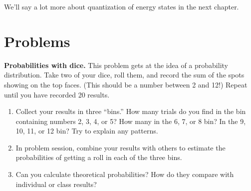 We'll say a lot more about quantization of energy states in the next chapter.

\newpage

\section*{Problems}
\label{sec:uncertainty_problems}



\begin{problem} 
 {\bf Probabilities with dice.} This problem gets at the idea of a
 probability distribution. Take two of your dice, roll them, and
 record the sum of the spots showing on the top faces.  (This should
 be a number between 2 and 12!)  Repeat until you have recorded 20
 results.
   \begin{enumerate}
   \item  Collect your results in three ``bins.''  How many trials do
   you find in the bin containing numbers 2, 3, 4, or 5? How many in
   the 6, 7, or 8 bin?  In the 9, 10, 11, or 12 bin?  Try to explain any
   patterns.
   \item  In problem session, combine your results with others to
   estimate the  probabilities of getting a roll in each of the three
   bins.
   \item Can you calculate theoretical probabilities?  How do they
    compare with individual or class results?
   \end{enumerate}
\label{prob:dice}
\end{problem}


